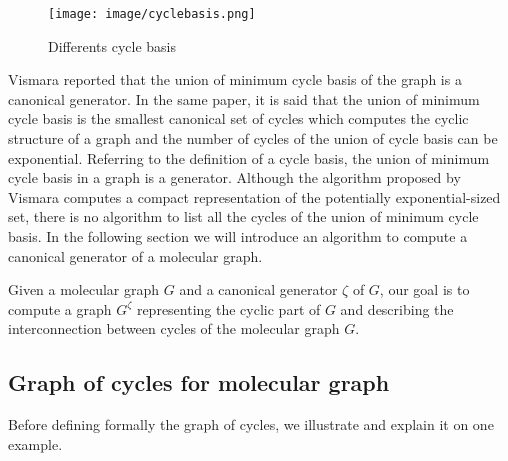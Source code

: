 \documentclass[journal=jacsat,manuscript=article]{achemso}
\begin{document}
\begin{figure}[H]
\begin{center}
\texttt{[image: image/cyclebasis.png]}
\end{center}
\caption{Differents cycle basis}
\label{fig:basis}
\end{figure}

Vismara \cite{Vismara1997} reported that the union of minimum cycle basis of the graph is a canonical generator. In the same paper, it is said that the union of minimum cycle basis is the smallest canonical set of cycles which computes the cyclic structure of a graph and the number of cycles of the union of cycle basis can be exponential. Referring to the definition of a cycle basis, the union of minimum cycle basis in a graph is a generator. Although the algorithm proposed by Vismara computes a compact representation of the potentially exponential-sized set, there is no algorithm to list all the cycles of the union of minimum cycle basis. In the following section we will introduce an algorithm to compute a canonical generator of a molecular graph.


Given a molecular graph $G$ and a canonical generator $\zeta$ of $G$, our goal is to compute a graph $G^\zeta$ representing the cyclic part of $G$ and describing the interconnection between cycles of the molecular graph $G$.


\subsection{Graph of cycles for molecular graph}

Before defining formally the graph of cycles, we illustrate and explain it on one example.
\end{document}

